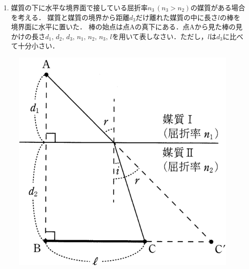 \begin{enumerate}[（1）]
  \setlength{\leftskip}{-1zw}
  \setlength{\itemindent}{1zw}\setlength{\labelsep}{0.5zw}
  \setlength{\labelwidth}{1zw}\setlength{\leftmargin}{1zw}
  \setlength{\itemsep}{0.5\baselineskip}
  \addtocounter{enumi}{3}
  \item 媒質の下に水平な境界面で接している屈折率$n_3\,(n_3>n_2)$の媒質がある場合を考える．
媒質と媒質の境界から距離$d_3$だけ離れた媒質の中に長さ$l$の棒を境界面に水平に置いた．
棒の始点は点Aの真下にある．点Aから見た棒の見かけの長さ$d_1,\,d_2,\,d_3,\,n_1,\,n_2,\,n_3,\,l$を用いて表しなさい．ただし，$l$は$d_3$に比べて十分小さい．
\end{enumerate}



\begin{figure}[H]
  \centering
  \begin{minipage}{.3\columnwidth}
    \includegraphics[width=\columnwidth]{../graphs/chiba_23_6-1.png}
    \caption{}
  \end{minipage}
  \hspace{.1\columnwidth}
  \begin{minipage}{.3\columnwidth}
    \centering

\end{minipage}
\end{figure}

